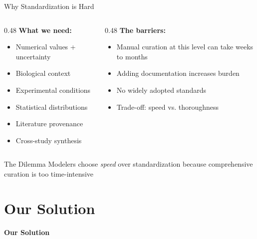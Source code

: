 \documentclass[10pt]{beamer}
\begin{document}
\begin{frame}{Why Standardization is Hard}

  \begin{columns}[T]
    \begin{column}{0.48\textwidth}
      \textbf{What we need:}
      \begin{itemize}
        \item Numerical values + uncertainty
        \item Biological context
        \item Experimental conditions
        \item Statistical distributions
        \item Literature provenance
        \item Cross-study synthesis
      \end{itemize}
    \end{column}

    \begin{column}{0.48\textwidth}
      \textbf{The barriers:}
      \begin{itemize}
        \item Manual curation at this level can take \alert{weeks to months}
        \item Adding documentation increases burden
        \item No widely adopted standards
        \item Trade-off: speed vs. thoroughness
      \end{itemize}
    \end{column}
  \end{columns}

  \vspace{0.5cm}

  \begin{block}{The Dilemma}
    Modelers choose \emph{speed} over standardization because comprehensive curation is too time-intensive
  \end{block}

\end{frame}

\section{Our Solution}

\begin{frame}[plain,c]
  \begin{center}
    \Huge\textbf{Our Solution}
  \end{center}
\end{frame}
\end{document}
